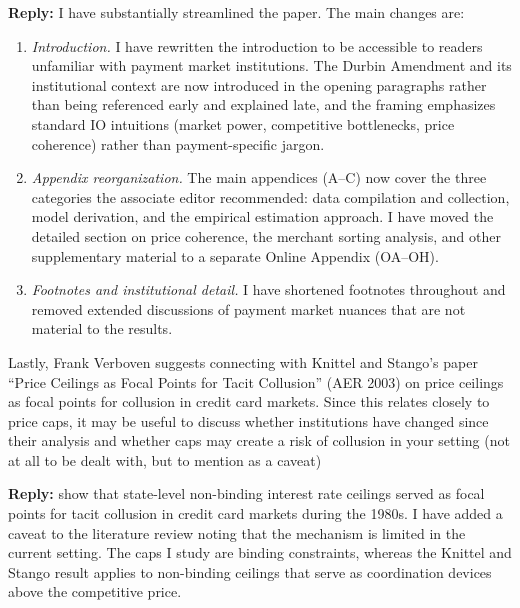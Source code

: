 \documentclass[main.tex]{subfiles}
\begin{document}
\begin{refsection}
\begin{refcommentnoclear}
\end{refcommentnoclear}

\textbf{Reply:} I have substantially streamlined the paper.
The main changes are:

\begin{enumerate}
  \item \emph{Introduction.} I have rewritten the introduction to be accessible to readers unfamiliar with payment market institutions.
  The Durbin Amendment and its institutional context are now introduced in the opening paragraphs rather than being referenced early and explained late, and the framing emphasizes standard IO intuitions (market power, competitive bottlenecks, price coherence) rather than payment-specific jargon.
  \item \emph{Appendix reorganization.} The main appendices (A--C) now cover the three categories the associate editor recommended: data compilation and collection, model derivation, and the empirical estimation approach.
  I have moved the detailed section on price coherence, the merchant sorting analysis, and other supplementary material to a separate Online Appendix (OA--OH).
  \item \emph{Footnotes and institutional detail.} I have shortened footnotes throughout and removed extended discussions of payment market nuances that are not material to the results.
\end{enumerate}

\begin{refcommentnoclear}
Lastly, Frank Verboven suggests connecting with Knittel and Stango's paper ``Price Ceilings as Focal Points for Tacit Collusion'' (AER 2003) on price ceilings as focal points for collusion in credit card markets.
Since this relates closely to price caps, it may be useful to discuss whether institutions have changed since their analysis and whether caps may create a risk of collusion in your setting (not at all to be dealt with, but to mention as a caveat)

\end{refcommentnoclear}

\textbf{Reply:} \textcite{Knittel.Stango2003} show that state-level non-binding interest rate ceilings served as focal points for tacit collusion in credit card markets during the 1980s.
I have added a caveat to the literature review noting that the mechanism is limited in the current setting.
The caps I study are binding constraints, whereas the Knittel and Stango result applies to non-binding ceilings that serve as coordination devices above the competitive price.

\clearpage
\printbibliography
\end{refsection}
\end{document}
